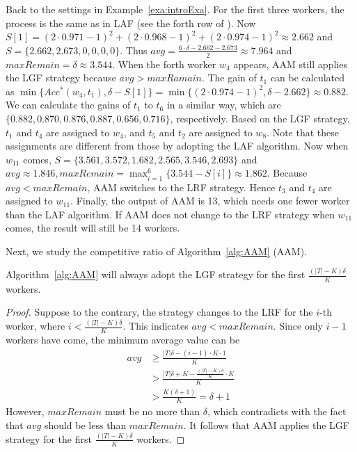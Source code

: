\begin{example}
Back to the settings in Example~\ref{exa:introExa}.
For the first three workers, the process is the same as in LAF (see the forth row of ).
Now $S[1] = (2\cdot0.971-1)^2+(2\cdot0.968-1)^2+(2\cdot0.974-1)^2 \approx 2.662$ and $S = \{2.662, 2.673, 0, 0, 0, 0\}$. 
Thus $avg = \frac{6\cdot\delta-2.662-2.673}{2} \approx 7.964$ and $maxRemain = \delta \approx 3.544$.
When the forth worker $w_4$ appears, AAM still applies the LGF strategy because $avg > maxRamain$.
The gain of $t_1$ can be calculated as $\min\{Acc^*(w_4, t_1), \delta-S[1]\}=\min\{(2\cdot0.974-1)^2, \delta-2.662\} \approx 0.882$.
We can calculate the gains of $t_1$ to $t_6$ in a similar way, which are $\{0.882, 0.870, 0.876, 0.887, 0.656, 0.716\}$, respectively.
Based on the LGF strategy, $t_1$ and $t_4$ are assigned to $w_4$, and $t_5$ and $t_2$ are assigned to $w_8$.
Note that these assignments are different from those by adopting the LAF algorithm.
Now when $w_{11}$ comes, $S = \{3.561, 3.572, 1.682, 2.565, 3.546, 2.693\}$ and $avg \approx 1.846, maxRemain = \max_{i=1}^{6}\{3.544 - S[i]\} \approx 1.862$.
Because $avg < maxRemain$, AAM switches to the LRF strategy.
Hence $t_3$ and $t_4$ are assigned to $w_{11}$.
Finally, the output of AAM is 13, which needs one fewer worker than the LAF algorithm. 
If AAM does not change to the LRF strategy when $w_{11}$ comes, the result will still be 14 workers.
\end{example}
	
Next, we study the competitive ratio of Algorithm~\ref{alg:AAM} (AAM).

\begin{lemma}	
\label{lem:lgfFirst}
Algorithm~\ref{alg:AAM} will always adopt the LGF strategy for the first $\frac{(|T|-K)\delta}{K}$ workers.
\end{lemma}
\begin{proof}
Suppose to the contrary, the strategy changes to the LRF for the $i$-th worker, where $i < \frac{(|T|-K)\delta}{K}$.
This indicates $avg < maxRemain$.
Since only $i - 1$ workers have come, the minimum average value can be
\begin{align*}
avg &\ge \frac{|T|\delta - (i-1) \cdot K \cdot 1}{K} \\
	&> \frac{|T|\delta + K - \frac{(|T|-K)\delta}{K} \cdot K}{K}  \\
	&> \frac{K(\delta+1)}{K} = \delta + 1
\end{align*}
However, $maxRemain$ must be no more than $\delta$, which contradicts with the fact that $avg$ should be less than $maxRemain$.
It follows that AAM applies the LGF strategy for the first $\frac{(|T|-K)\delta}{K}$ workers.
\end{proof}

